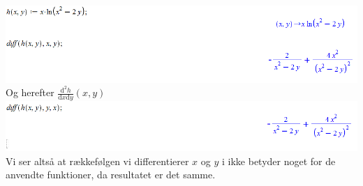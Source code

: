 \documentclass[12pt]{article}
\begin{document}
\includegraphics[scale=0.6]{Pic3}\\
Og herefter $\frac{\mathrm{d}^2h}{\mathrm{d} x\mathrm{d} y}(x,y)$\\
\includegraphics[scale=0.6]{Pic4}\\
Vi ser altså at rækkefølgen vi differentierer $x$ og $y$ i ikke betyder noget for de anvendte funktioner, da resultatet er det samme.

\newpage
\end{document}
